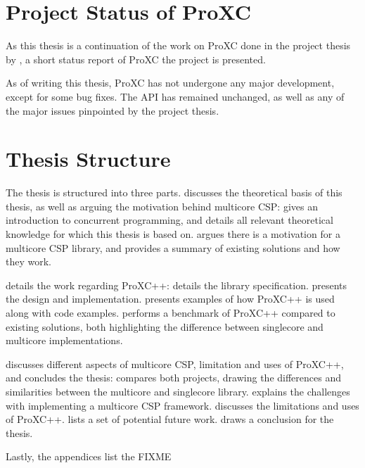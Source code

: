 \section{Project Status of ProXC}

As this thesis is a continuation of the work on ProXC done in the project thesis by \citet{pettersen2016proxc}, a short status report of ProXC the project is presented.

As of writing this thesis, ProXC has not undergone any major development, except for some bug fixes. The API has remained unchanged, as well as any of the major issues pinpointed by the project thesis. 


\section{Thesis Structure}


The thesis is structured into three parts.  discusses the theoretical basis of this thesis, as well as arguing the motivation behind multicore CSP:  gives an introduction to concurrent programming, and details all relevant theoretical knowledge for which this thesis is based on.  argues there is a motivation for a multicore CSP library, and provides a summary of existing solutions and how they work. 

 details the work regarding ProXC++:  details the library specification.  presents the design and implementation.  presents examples of how ProXC++ is used along with code examples.  performs a benchmark of ProXC++ compared to existing solutions, both highlighting the difference between singlecore and multicore implementations.

 discusses different aspects of multicore CSP, limitation and uses of ProXC++, and concludes the thesis:  compares both projects, drawing the differences and similarities between the multicore and singlecore library.  explains the challenges with implementing a multicore CSP framework.  discusses the limitations and uses of ProXC++.  lists a set of potential future work.  draws a conclusion for the thesis.


Lastly, the appendices list the FIXME
